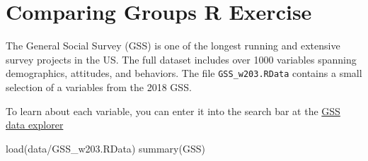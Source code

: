 \documentclass[
]{book}
\newenvironment{Shaded}{\begin{snugshade}}{\end{snugshade}}
\newcommand{\FunctionTok}[1]{\textcolor[rgb]{0.00,0.00,0.00}{#1}}
\newcommand{\NormalTok}[1]{#1}
\newcommand{\StringTok}[1]{\textcolor[rgb]{0.31,0.60,0.02}{#1}}
\theoremstyle{definition}
\theoremstyle{definition}
\theoremstyle{definition}
\theoremstyle{definition}
\theoremstyle{remark}
\begin{document}
\hypertarget{comparing-groups-r-exercise}{%
\section{Comparing Groups R Exercise}\label{comparing-groups-r-exercise}}

The General Social Survey (GSS) is one of the longest running and extensive survey projects in the US. The full dataset includes over 1000 variables spanning demographics, attitudes, and behaviors. The file \texttt{GSS\_w203.RData} contains a small selection of a variables from the 2018 GSS.

To learn about each variable, you can enter it into the search bar at the \href{https://gssdataexplorer.norc.org/variables/vfilter}{GSS data explorer}

\begin{Shaded}
\begin{Highlighting}[]
\FunctionTok{load}\NormalTok{(}\StringTok{\textquotesingle{}data/GSS\_w203.RData\textquotesingle{}}\NormalTok{)}
\FunctionTok{summary}\NormalTok{(GSS)}
\end{Highlighting}
\end{Shaded}
\end{document}

